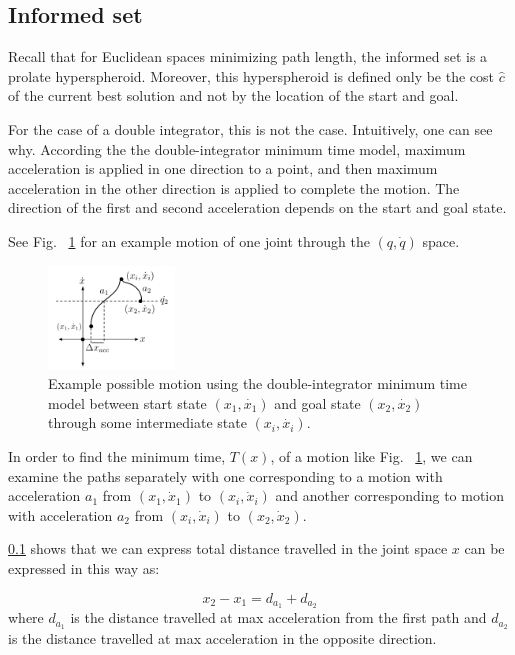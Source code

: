 \documentclass[letterpaper, 10 pt, conference]{ieeeconf}  %
\begin{document}
\subsection{Informed set}
Recall that for Euclidean spaces minimizing path length, the informed set is a prolate hyperspheroid.
Moreover, this hyperspheroid is defined only be the cost $\hat{c}$ of the current best solution and not by the location of the start and goal.

For the case of a double integrator, this is not the case. Intuitively, one can see why. According the the double-integrator minimum time model, maximum acceleration is applied in one direction to a point, and then maximum acceleration in the other direction is applied to complete the motion. The direction of the first and second acceleration depends on the start and goal state.

See Fig. ~\ref{fig:sample_dimt} for an example motion of one joint through the $\left(q,\dot{q}\right)$ space. 

\begin{figure}[tb]
  \centering
  	\includegraphics[width=0.3\textwidth]{fig/example_motion.png}
  \caption{
    \captionstyle
  	Example possible motion using the double-integrator minimum time model between start state $(x_1, \dot{x_1})$ and goal state $(x_2, \dot{x_2})$ through some intermediate state $(x_i, \dot{x_i})$.
  	}
   	\label{fig:sample_dimt}
\end{figure}

In order to find the minimum time, $T\left(x\right)$, of a motion like Fig. ~\ref{fig:sample_dimt}, we can examine the paths separately with one corresponding to a motion with acceleration $a_1$ from $\left(x_1, \dot{x}_1\right)$ to $\left(x_i, \dot{x}_i\right)$ and another corresponding to motion with acceleration $a_2$ from $\left(x_i, \dot{x}_i\right)$ to $\left(x_2, \dot{x}_2\right)$.

\ref{} shows that we can express total distance travelled in the joint space $x$ can be expressed in this way as:

\begin{equation}
x_2 - x_1 = d_{a_1} + d_{a_2}
\end{equation}
where $d_{a_1}$ is the distance travelled at max acceleration from the first path and $d_{a_2}$ is the distance travelled at max acceleration in the opposite direction.
\end{document}
